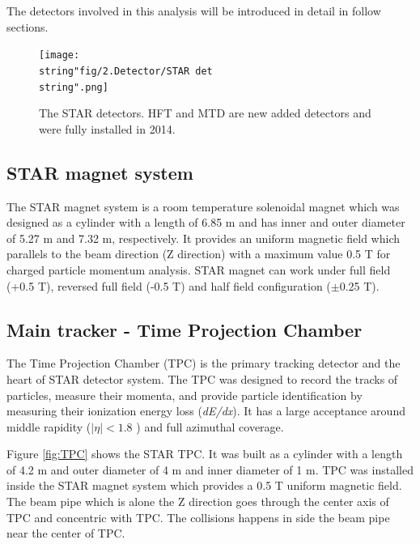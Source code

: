 The detectors involved in this analysis will be introduced in detail
in follow sections. 

\begin{figure}
\begin{centering}
\texttt{[image: \\string"fig/2.Detector/STAR det\\string".png]}
\par\end{centering}

\protect\caption{The STAR detectors. HFT and MTD are new added detectors and were fully
installed in 2014.}


\label{fig: STAR det}
\end{figure}



\subsection{STAR magnet system}

The STAR magnet system \cite{Ackermann2003624} is a room temperature
solenoidal magnet which was designed as a cylinder with a length of
6.85 m and has inner and outer diameter of 5.27 m and 7.32 m, respectively.
It provides an uniform magnetic field which parallels to the beam
direction (Z direction) with a maximum value 0.5 T for charged particle
momentum analysis. STAR magnet can work under full field (+0.5 T),
reversed full field (-0.5 T) and half field configuration ($\pm$0.25
T).


\subsection{Main tracker - Time Projection Chamber}

The Time Projection Chamber (TPC) is the primary tracking detector
and the heart of STAR detector system. The TPC was designed to record
the tracks of particles, measure their momenta, and provide particle
identification by measuring their ionization energy loss (\emph{dE/dx}).
It has a large acceptance around middle rapidity ($|\eta|<1.8$ )
and full azimuthal coverage. 

Figure \ref{fig:TPC} shows the STAR TPC. It was built as a cylinder
with a length of 4.2 m and outer diameter of 4 m and inner diameter
of 1 m. TPC was installed inside the STAR magnet system which provides
a 0.5 T uniform magnetic field. The beam pipe which is alone the Z
direction goes through the center axis of TPC and concentric with
TPC. The collisions happens in side the beam pipe near the center
of TPC.

